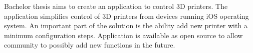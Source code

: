 Bachelor thesis aims to create an application to control 3D printers.
The application simplifies control of 3D printers from devices running iOS operating system.
An important part of the solution is the ability add new printer with a minimum configuration steps.
Application is available as open source to allow community to possibly add new functions in the future.
